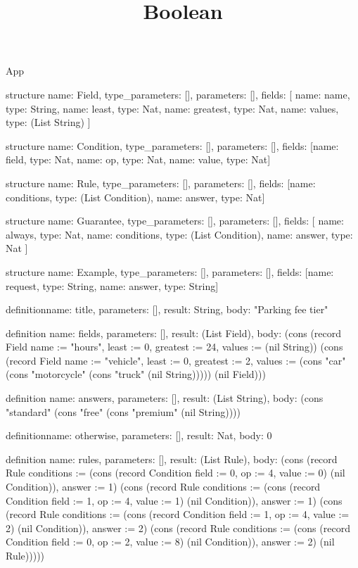 \begin{lexlean}{App}
\title{Boolean}
\begin{semanticmodule}
structure{
  name: Field,
  type_parameters: [],
  parameters: [],
  fields: [
    {name: name, type: String},
    {name: least, type: Nat},
    {name: greatest, type: Nat},
    {name: values, type: (List String)}
  ]
}

structure{
  name: Condition,
  type_parameters: [],
  parameters: [],
  fields: [{name: field, type: Nat}, {name: op, type: Nat}, {name: value, type: Nat}]
}

structure{
  name: Rule,
  type_parameters: [],
  parameters: [],
  fields: [{name: conditions, type: (List Condition)}, {name: answer, type: Nat}]
}

structure{
  name: Guarantee,
  type_parameters: [],
  parameters: [],
  fields: [
    {name: always, type: Nat},
    {name: conditions, type: (List Condition)},
    {name: answer, type: Nat}
  ]
}

structure{
  name: Example,
  type_parameters: [],
  parameters: [],
  fields: [{name: request, type: String}, {name: answer, type: String}]
}

definition{name: title, parameters: [], result: String, body: "Parking fee tier"}

definition{
  name: fields,
  parameters: [],
  result: (List Field),
  body: (cons (record Field {name := "hours", least := 0, greatest := 24, values := (nil String)}) (cons (record Field {name := "vehicle", least := 0, greatest := 2, values := (cons "car" (cons "motorcycle" (cons "truck" (nil String))))}) (nil Field)))
}

definition{
  name: answers,
  parameters: [],
  result: (List String),
  body: (cons "standard" (cons "free" (cons "premium" (nil String))))
}

definition{name: otherwise, parameters: [], result: Nat, body: 0}

definition{
  name: rules,
  parameters: [],
  result: (List Rule),
  body: (cons (record Rule {conditions := (cons (record Condition {field := 0, op := 4, value := 0}) (nil Condition)), answer := 1}) (cons (record Rule {conditions := (cons (record Condition {field := 1, op := 4, value := 1}) (nil Condition)), answer := 1}) (cons (record Rule {conditions := (cons (record Condition {field := 1, op := 4, value := 2}) (nil Condition)), answer := 2}) (cons (record Rule {conditions := (cons (record Condition {field := 0, op := 2, value := 8}) (nil Condition)), answer := 2}) (nil Rule)))))
}


\end{semanticmodule}
\end{lexlean}

